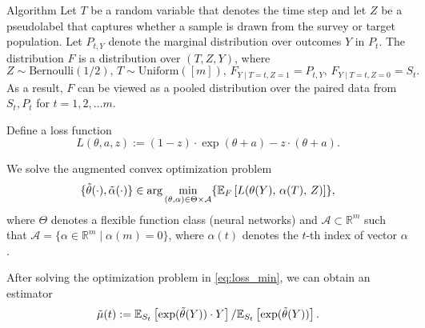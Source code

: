 \documentclass{article}
\theoremstyle{definition}
\theoremstyle{plain}
\theoremstyle{remark}
\begin{document}
\begin{section}{Algorithm}
Let $T$ be a random variable that denotes the time step and let $Z$ be a pseudolabel that captures whether a sample is drawn from the survey or target population. Let $P_{t, Y}$ denote the marginal distribution over outcomes $Y$ in $P_{t}.$ The distribution $F$ is a distribution over $(T, Z, Y)$, where 
\[Z  \sim \text{Bernoulli}(1/2),\, T \sim \text{Uniform}([m]),\, F_{Y \mid T=t, Z=1} = P_{t, Y},\, F_{Y \mid T=t, Z= 0} = S_{t}.\]
As a result, $F$ can be viewed as a pooled distribution over the paired data from $S_{t}, P_{t}$ for $t=1, 2, \dots m$.

Define a loss function 
\begin{equation} L(\theta, a, z) := (1 - z) \cdot \exp(\theta + a) - z \cdot (\theta + a).\end{equation}

We solve the augmented convex optimization problem
\begin{equation} 
\label{eq:loss_min}
\{\tilde{\theta}(\cdot), \tilde{\alpha}(\cdot)\} \in \arg\min_{(\theta, \alpha) \in \Theta \times \mathcal{A}} \{\EE[F]{L(\theta(Y),\, \alpha(T),\, Z)}\},\end{equation}
where $\Theta$ denotes a flexible function class (neural networks) and $\mathcal{A} \subset \mathbb{R}^{m}$ such that $\mathcal{A}= \{ \alpha \in \mathbb{R}^{m} \mid \alpha(m) = 0 \}$, where $\alpha(t)$ denotes the $t$-th index of vector $\alpha$.

After solving the optimization problem in \eqref{eq:loss_min}, we can obtain an estimator
\[\tilde{\mu}(t) := \EE[S_{t}]{\exp(\tilde{\theta}(Y)) \cdot Y} / \EE[S_{t}]{\exp(\tilde{\theta}(Y))}.\]

\end{section}
\end{document}

